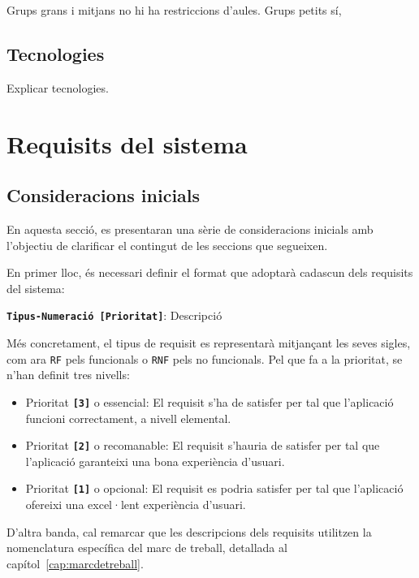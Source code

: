 \documentclass[a4paper,12pt]{ThesisStyle}
\begin{document}
Grups grans i mitjans no hi ha restriccions d'aules. Grups petits sí,

\section{Tecnologies}
\label{sec:tecnologies}

Explicar tecnologies.

\chapter{Requisits del sistema}
\label{cap:requisits}

\section{Consideracions inicials}
\label{sec:consideracions_inicials}

En aquesta secció, es presentaran una sèrie de consideracions inicials amb l'objectiu de clarificar el contingut de les seccions que segueixen.

En primer lloc, és necessari definir el format que adoptarà cadascun dels requisits del sistema:
\vspace*{-0.4cm}
\begin{center}
  \texttt{\textbf{Tipus-Numeració [Prioritat]}}: Descripció
\end{center}

Més concretament, el tipus de requisit es representarà mitjançant les seves sigles, com ara \texttt{RF} pels funcionals o \texttt{RNF} pels no funcionals. Pel que fa a la prioritat, se n'han definit tres nivells:
\begin{itemize}
  \item Prioritat \texttt{\textbf{[3]}} o essencial: El requisit s'ha de satisfer per tal que l'aplicació funcioni correctament, a nivell elemental.
  \item Prioritat \texttt{\textbf{[2]}} o recomanable: El requisit s'hauria de satisfer per tal que l'aplicació garanteixi una bona experiència d'usuari.
  \item Prioritat \texttt{\textbf{[1]}} o opcional: El requisit es podria satisfer per tal que l'aplicació ofereixi una excel·lent experiència d'usuari.
\end{itemize}

D'altra banda, cal remarcar que les descripcions dels requisits utilitzen la nomenclatura específica del marc de treball, detallada al capítol~\ref{cap:marcdetreball}.
\end{document}
